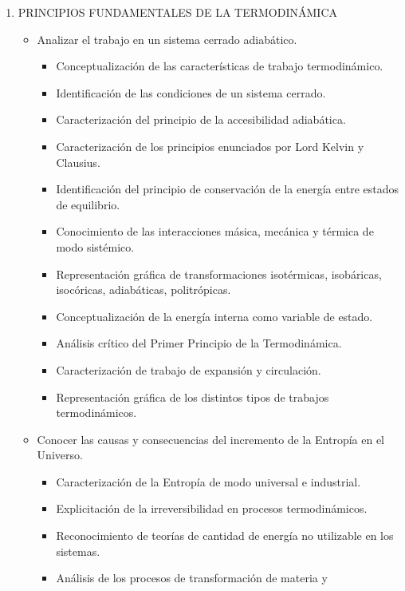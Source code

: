 \documentclass[../main]{subfiles}
\begin{document}
\begin{enumerate}
  \item PRINCIPIOS FUNDAMENTALES DE LA TERMODINÁMICA
    \begin{itemize}
      \item Analizar el trabajo en un
        sistema cerrado adiabático.
        \begin{itemize}
          \item Conceptualización de las características de trabajo
            termodinámico.
          \item Identificación de las condiciones de un sistema cerrado.
          \item Caracterización del principio de la accesibilidad
            adiabática.
          \item Caracterización de los principios enunciados por Lord
            Kelvin y Clausius.
          \item Identificación del principio de conservación de la energía
            entre estados de equilibrio.
          \item Conocimiento de las interacciones másica, mecánica y
            térmica de modo sistémico.
          \item Representación gráfica de transformaciones isotérmicas,
            isobáricas, isocóricas, adiabáticas, politrópicas.
          \item Conceptualización de la energía interna como variable de
            estado.
          \item Análisis crítico del Primer Principio de la Termodinámica.
          \item Caracterización de trabajo de expansión y circulación.
          \item Representación gráfica de los distintos tipos de trabajos
            termodinámicos.
        \end{itemize}
      \item Conocer las causas y consecuencias del incremento de la
        Entropía en el Universo.
        \begin{itemize}
          \item  Caracterización de la Entropía de modo universal e industrial.
          \item Explicitación de la irreversibilidad en procesos
            termodinámicos.
          \item Reconocimiento de teorías de cantidad de energía no
            utilizable en los sistemas.
          \item Análisis de los procesos de transformación de materia y

\end{itemize}
\end{itemize}
\end{enumerate}
\end{document}
